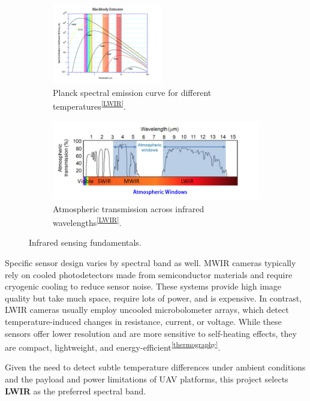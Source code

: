 \begin{figure}[h!]
    \centering
    \begin{subfigure}[b]{0.48\linewidth}
        \centering
        \includegraphics[height=3.5cm]{figs/Huirui/wien_law_plot.png}
        \caption{Planck spectral emission curve for different temperatures\textsuperscript{\ref{LWIR}}.}
        \label{fig:wien_law}
    \end{subfigure}
    \hfill
    \begin{subfigure}[b]{0.48\linewidth}
        \centering
        \includegraphics[height=3.5cm]{figs/Huirui/atmospheric_window_plot.png}
        \caption{Atmospheric transmission across infrared wavelengths\textsuperscript{\ref{LWIR}}.}
        \label{fig:atmos_window}
    \end{subfigure}
    \caption{Infrared sensing fundamentals.}
\end{figure}

Specific sensor design varies by spectral band as well. MWIR cameras typically rely on cooled photodetectors made from semiconductor materials and require cryogenic cooling to reduce sensor noise. These systems provide high image quality but take much space, require lots of power, and is expensive. In contrast, LWIR cameras usually employ uncooled microbolometer arrays, which detect temperature-induced changes in resistance, current, or voltage. While these sensors offer lower resolution and are more sensitive to self-heating effects, they are compact, lightweight, and energy-efficient\textsuperscript{\ref{thermography}}.

Given the need to detect subtle temperature differences under ambient conditions and the payload and power limitations of UAV platforms, this project selects \textbf{LWIR} as the preferred spectral band.


